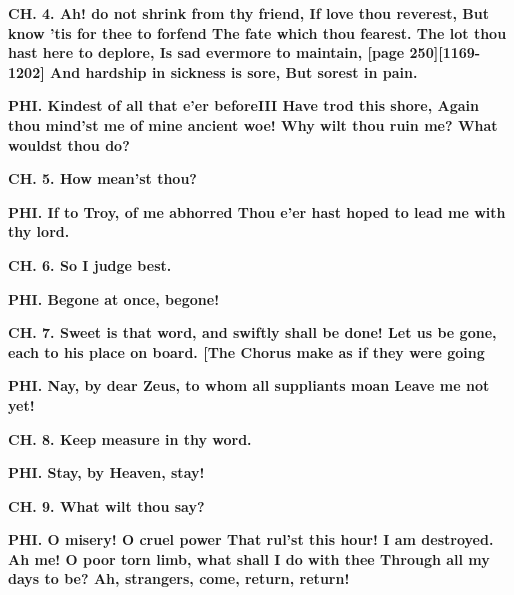 \documentclass[11pt,letter]{book}
\begin{document}
\par \textbf{CH. 4. Ah! do not shrink from thy friend, If love thou reverest, But know ’tis for thee to forfend The fate which thou fearest. The lot thou hast here to deplore, Is sad evermore to maintain, [page 250][1169-1202] And hardship in sickness is sore, But sorest in pain.}
\par 

\par \textbf{PHI. Kindest of all that e’er beforeIII Have trod this shore, Again thou mind’st me of mine ancient woe! Why wilt thou ruin me? What wouldst thou do?}
\par 

\par \textbf{CH. 5. How mean’st thou?}
\par 

\par \textbf{PHI. If to Troy, of me abhorred Thou e’er hast hoped to lead me with thy lord.}
\par 

\par \textbf{CH. 6. So I judge best.}
\par 

\par \textbf{PHI. Begone at once, begone!}
\par 

\par \textbf{CH. 7. Sweet is that word, and swiftly shall be done! Let us be gone, each to his place on board. [The Chorus make as if they were going}
\par 

\par \textbf{PHI. Nay, by dear Zeus, to whom all suppliants moan Leave me not yet!}
\par 

\par \textbf{CH. 8. Keep measure in thy word.}
\par 

\par \textbf{PHI. Stay, by Heaven, stay!}
\par 

\par \textbf{CH. 9. What wilt thou say?}
\par 

\par \textbf{PHI. O misery! O cruel power That rul’st this hour! I am destroyed. Ah me! O poor torn limb, what shall I do with thee Through all my days to be? Ah, strangers, come, return, return!}
\par 
\end{document}
